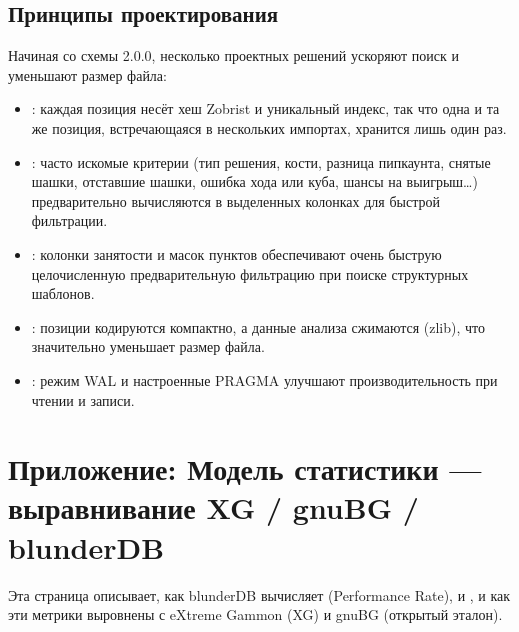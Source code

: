 \documentclass[letterpaper,10pt,russian]{sphinxmanual}
\begin{document}
\subsection{Принципы проектирования}
\label{\detokenize{annexe_db_scheme:principes-de-conception}}
\sphinxAtStartPar
Начиная со схемы 2.0.0, несколько проектных решений ускоряют поиск и уменьшают размер файла:
\begin{itemize}
\item {} 
\sphinxAtStartPar
{}: каждая позиция несёт хеш Zobrist и уникальный индекс, так что одна и та же позиция, встречающаяся в нескольких импортах, хранится лишь один раз.

\item {} 
\sphinxAtStartPar
{}: часто искомые критерии (тип решения, кости, разница пипкаунта, снятые шашки, отставшие шашки, ошибка хода или куба, шансы на выигрыш…) предварительно вычисляются в выделенных колонках для быстрой фильтрации.

\item {} 
\sphinxAtStartPar
{}: колонки занятости и масок пунктов обеспечивают очень быструю целочисленную предварительную фильтрацию при поиске структурных шаблонов.

\item {} 
\sphinxAtStartPar
{}: позиции кодируются компактно, а данные анализа сжимаются (zlib), что значительно уменьшает размер файла.

\item {} 
\sphinxAtStartPar
{}: режим WAL и настроенные PRAGMA улучшают производительность при чтении и записи.

\end{itemize}

\sphinxstepscope


\section{Приложение: Модель статистики — выравнивание XG / gnuBG / blunderDB}
\label{\detokenize{stats_parity:annexe-modele-de-statistiques-alignement-xg-gnubg-blunderdb}}\label{\detokenize{stats_parity:stats-parity}}\label{\detokenize{stats_parity::doc}}
\sphinxAtStartPar
Эта страница описывает, как blunderDB вычисляет  (Performance Rate),  и , и как эти метрики выровнены с eXtreme Gammon (XG) и gnuBG (открытый эталон).
\end{document}
